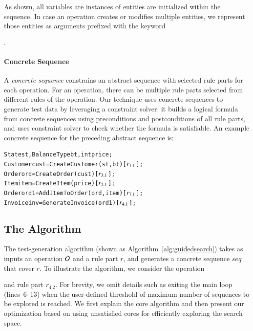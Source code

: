 As shown, all variables are instances of entities are initialized within the sequence.
In case an operation creates or modifies multiple entities,
we represent those entities as arguments prefixed with the keyword \subject{out}. 

\vskip -7pt
\paragraph*{Concrete Sequence} A \textit{concrete sequence} constrains an
abstract sequence with selected rule parts for each operation. For an operation,
there can be multiple rule parts selected from different rules of the
operation. Our technique uses concrete sequences to generate test data by
leveraging a constraint solver: it builds a logical formula from concrete
sequences using preconditions and postconditions of all rule parts, and uses
constraint solver to check whether the formula is satisfiable. An example
concrete sequence for the preceding abstract sequence is:

\vspace*{-4pt}
{\scriptsize
\begin{alltt} 
 State st, BalanceType bt, int price;
 Customer cust = CreateCustomer(st, bt) [\(r\sb{1.1}\)];
 Order ord = CreateOrder(cust) [\(r\sb{3.1}\)];	
 Item item = CreateItem(price) [\(r\sb{2.1}\)];
 Order ord1 = AddItemToOrder(ord, item) [\(r\sb{7.1}\)];
 Invoice inv = GenerateInvoice(ord1) [\(r\sb{4.1}\)];  
\end{alltt}
}
\vspace*{-5pt}

\subsection{The Algorithm}
\label{sec:technique}

The test-generation algorithm (shown as Algorithm~\ref{alg:guidedsearch}) takes
as inputs an operation ${\cal O}$ and a rule part $r$, and generates a concrete
sequence $seq$ that cover $r$. To illustrate the algorithm, we consider the
operation \subject{GenerateInvoice} and rule part $r_{4.2}$. For brevity, we
omit details such as exiting the main loop (lines~6--13) when the user-defined
threshold of maximum number of sequences to be explored is reached. We first
explain the core algorithm and then present our optimization based on using
unsatisfied cores for efficiently exploring the search space.

